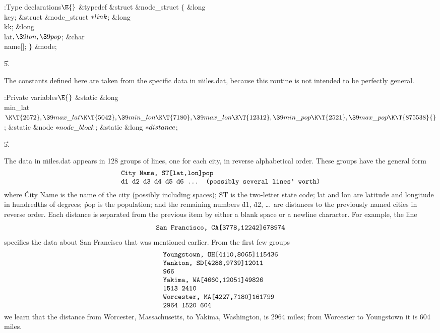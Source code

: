 \Y\B\4:Type declarations\X${}\E{}$\6
\&{typedef} \&{struct} \&{node\_struct} ${}\{{}$\1\6
\&{long} \\{key};\6
\&{struct} \&{node\_struct} ${}{*}\\{link}{}$;\6
\&{long} \\{kk};\6
\&{long} \\{lat}${},\39\\{lon},\39\\{pop}{}$;\6
\&{char} \\{name}[];\2\6
${}\}{}$ \&{node};\par
\U5.\fi

The constants defined here are taken from the specific data in %
\.{miles.dat},
because this routine is not intended to be perfectly general.

\Y\B\4:Private variables\X${}\E{}$\6
\&{static} \&{long} \\{min\_lat}${}\K\T{2672},\39\\{max\_lat}\K\T{5042},\39%
\\{min\_lon}\K\T{7180},\39\\{max\_lon}\K\T{12312},\39\\{min\_pop}\K\T{2521},\39%
\\{max\_pop}\K\T{875538}{}$;\6
\&{static} \&{node} ${}{*}\\{node\_block}{}$;\6
\&{static} \&{long} ${}{*}\\{distance}{}$;\par
\U5.\fi

The data in \.{miles.dat} appears in 128 groups of lines, one for each
city, in reverse alphabetical order. These groups have the general form
$$\vcenter{\halign{\tt#\hfil\cr
City Name, ST[lat,lon]pop\cr
d1 d2 d3 d4 d5 d6 ... (possibly several lines' worth)\cr
}}$$
where \.{City Name} is the name of the city (possibly including spaces);
\.{ST} is the two-letter state code; \.{lat} and \.{lon} are latitude
and longitude in hundredths of degrees; \.{pop} is the population; and
the remaining numbers \.{d1}, \.{d2}, \dots\ are distances to the
previously named cities in reverse order. Each distance is separated
from the previous item by either a blank space or a newline character.
For example, the line
$$\hbox{\tt San Francisco, CA[3778,12242]678974}$$
specifies the data about San Francisco that was mentioned earlier.
From the first few groups
$$\vcenter{\halign{\tt#\hfil\cr
Youngstown, OH[4110,8065]115436\cr
Yankton, SD[4288,9739]12011\cr
966\cr
Yakima, WA[4660,12051]49826\cr
1513 2410\cr
Worcester, MA[4227,7180]161799\cr
2964 1520 604\cr
}}$$
we learn that the distance from Worcester, Massachusetts, to Yakima,
Washington, is 2964 miles; from Worcester to Youngstown it is 604 miles.

